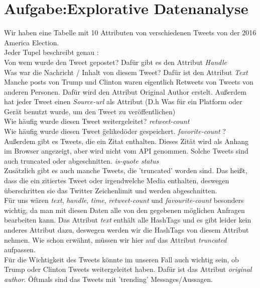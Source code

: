 \section{Aufgabe:Explorative Datenanalyse}

Wir haben eine Tabelle mit 10 Attributen von verschiedenen Tweets von der 2016 America Election.\\
Jeder Tupel beschreibt genau :\\

Von wem wurde den Tweet gepostet? Dafür gibt es den Attribut {\itshape Handle}\\
Was war die Nachricht / Inhalt von diesem Tweet? Dafür ist den Attribut {\itshape Text}\\
Manche posts von Trump und Clinton waren eigentlich Retweets von Tweets von anderen Personen.
Dafür wird den Attribut Original Author erstelt.
Außerdem hat jeder Tweet einen {\itshape Source-url} als Attribut (D.h Was für ein Platform oder Gerät benutzt wurde, um den Tweet zu veröffentlichen)\\
Wie häufig wurde diesen Tweet weitergeleitet?  {\itshape retweet-count}\\
Wie häufig wurde diesen Tweet \"geliked\" oder gespeichert. {\itshape favorite-count }?\\

Außerdem gibt es Tweets, die ein Zitat enthalten. Dieses Zität wird als Anhang im Browser angezeigt, aber wird nicht vom API genommen. Solche Tweets sind auch truncated oder abgeschnitten. {\itshape is-quote status}\\
Zusätzlich gibt es auch manche Tweets, die 'truncated' worden sind. Das heißt, dass die ein zitiertes Tweet oder irgendwelche Media enthalten, deswegen überschritten sie das Twitter Zeichenlimit und werden abgeschnitten.\\ 

Für uns wären {\itshape text}, {\itshape handle}, {\itshape time}, {\itshape retweet-count} und {\itshape favourite-count} besonders wichtig, da man mit diesen Daten alle von den gegebenen möglichen Anfragen bearbeiten kann. Das Attribut {\itshape text} enthält alle HashTags und es gibt leider kein anderes Attribut dazu, deswegen werden wir die HashTags von diesem Attribut nehmen. Wie schon erwähnt, müssen wir hier auf das Attribut {\itshape truncated} aufpassen. \\

Für die Wichtigkeit des Tweets könnte im unseren Fall auch wichtig sein, ob Trump oder Clinton Tweets weitergeleitet haben. Dafür ist das Attribut {\itshape  original author}. Öftmals sind das Tweets mit 'trending' Messages/Aussagen. 

